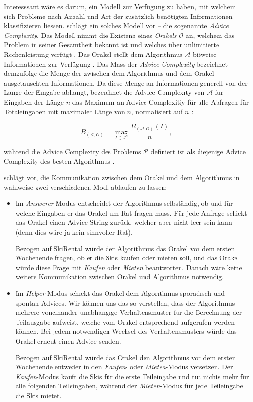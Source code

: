 \documentclass[11pt]{scrreprt} %
\theoremstyle{definition}
\begin{document}
\bigskip
Interesssant wäre es darum, ein Modell zur Verfügung zu haben, mit welchem sich Probleme nach Anzahl und Art der zusätzlich benötigten Informationen klassifizieren liessen. \cite{Dobrev} schlägt ein solches Modell vor \cite{BKK} -- die sogenannte {\sl Advice Complexity}. Das Modell nimmt die Existenz eines {\sl Orakels} $\mathcal{O}$ an, welchem das Problem in seiner Gesamtheit bekannt ist und welches über unlimitierte Rechenleistung verfügt \cite{Dobrev, BKK}. Das Orakel stellt dem Algorithmus $\mathcal{A}$ bitweise Informationen zur Verfügung \cite{Dobrev}. Das Mass der {\sl Advice Complexity} bezeichnet demzufolge die Menge der zwischen dem Algorithmus und dem Orakel ausgetauschten Informationen. Da diese Menge an Informationen generell von der Länge der Eingabe abhängt, bezeichnet die Advice Complexity von $\mathcal{A}$ für Eingaben der Länge $n$ das Maximum an Advice Complexitiy für alle Abfragen für Totaleingaben mit maximaler Länge von $n$, normalisiert auf $n$ \cite{BKK}:

\[
	B_{(\mathcal{A}, \mathcal{O})} = \max_{I \in \mathcal{I}^n} \frac { B_{(\mathcal{A}, \mathcal{O})}(I) }{n},
\]

während die Advice Complexity des Problems $\mathcal{P}$ definiert ist als diejenige Advice Complexity des besten Algorithmus \cite{bipartite}.

\bigskip

\cite{Dobrev} schlägt vor, die Kommunikation zwischen dem Orakel und dem Algorithmus in wahlweise zwei verschiedenen Modi ablaufen zu lassen:

\begin{itemize}
\item Im {\sl Answerer}-Modus entscheidet der Algorithmus selbständig, ob und für welche Eingaben er das Orakel um Rat fragen muss. Für jede Anfrage schickt das Orakel einen Advice-String zurück, welcher aber nicht leer sein kann \cite{Dobrev} (denn dies wäre ja kein sinnvoller Rat).

Bezogen auf {\sc SkiRental} würde der Algorithmus das Orakel vor dem ersten Wochenende fragen, ob er die Skis kaufen oder mieten soll, und das Orakel würde diese Frage mit {\sl Kaufen} oder {\sl Mieten} beantworten. Danach wäre keine weitere Kommunikation zwischen Orakel und Algorithmus notwendig.

\item Im {\sl Helper}-Modus schickt das Orakel dem Algorithmus sporadisch und spontan Advices. Wir können uns das so vorstellen, dass der Algorithmus mehrere voneinander unabhängige Verhaltensmuster für die Berechnung der Teilausgabe aufweist, welche vom Orakel entsprechend aufgerufen werden können. Bei jedem notwendigen Wechsel des Verhaltensmusters würde das Orakel erneut einen Advice senden.

Bezogen auf {\sc SkiRental} würde das Orakel den Algorithmus vor dem ersten Wochenende entweder in den {\sl Kaufen}- oder {\sl Mieten}-Modus versetzen. Der {\sl Kaufen}-Modus kauft die Skis für die erste Teileingabe und tut nichts mehr für alle folgenden Teileingaben, während der {\sl Mieten}-Modus für jede Teileingabe die Skis mietet.
\end{itemize}
\end{document}
